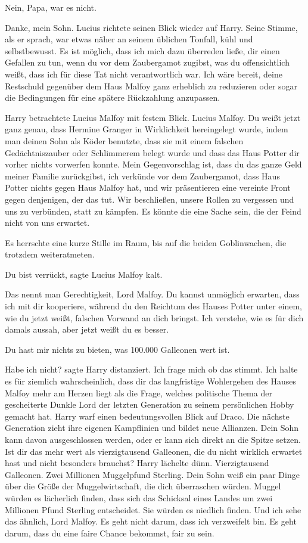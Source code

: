 \glqq{}Nein, Papa, war es nicht.\grqq{}

\glqq{}Danke, mein Sohn.\grqq{} Lucius richtete seinen Blick wieder auf Harry.
Seine Stimme, als er sprach, war etwas näher an seinem üblichen Tonfall, kühl
und selbstbewusst. \glqq{}Es ist möglich, dass ich mich dazu überreden ließe, dir
einen Gefallen zu tun, wenn du vor dem Zaubergamot zugibst, was du
offensichtlich weißt, dass ich für diese Tat nicht verantwortlich war. Ich wäre
bereit, deine Restschuld gegenüber dem Haus Malfoy ganz erheblich zu reduzieren
oder sogar die Bedingungen für eine spätere Rückzahlung anzupassen.\grqq{}

Harry betrachtete Lucius Malfoy mit festem Blick. \glqq{}Lucius Malfoy. Du weißt
jetzt ganz genau, dass Hermine Granger in Wirklichkeit hereingelegt wurde, indem
man deinen Sohn als Köder benutzte, dass sie mit einem falschen Gedächtniszauber
oder Schlimmerem belegt wurde und dass das Haus Potter dir vorher nichts
vorwerfen konnte. Mein Gegenvorschlag ist, dass du das ganze Geld meiner Familie
zurückgibst, ich verkünde vor dem Zaubergamot, dass Haus Potter nichts gegen
Haus Malfoy hat, und wir präsentieren eine vereinte Front gegen denjenigen, der
das tut. Wir beschließen, unsere Rollen zu vergessen und uns zu verbünden, statt
zu kämpfen. Es könnte die eine Sache sein, die der Feind nicht von uns
erwartet.\grqq{}

Es herrschte eine kurze Stille im Raum, bis auf die beiden Goblinwachen, die
trotzdem weiteratmeten.

\glqq{}Du bist verrückt\grqq{}, sagte Lucius Malfoy kalt.

\glqq{}Das nennt man Gerechtigkeit, Lord Malfoy. Du kannst unmöglich erwarten,
dass ich mit dir kooperiere, während du den Reichtum des Hauses Potter unter
einem, wie du jetzt weißt, falschen Vorwand an dich bringst. Ich verstehe, wie
es für dich damals aussah, aber jetzt weißt du es besser.\grqq{}

\glqq{}Du hast mir nichts zu bieten, was 100.000 Galleonen wert ist.\grqq{}

\glqq{}Habe ich nicht?\grqq{} sagte Harry distanziert. \glqq{}Ich frage mich ob
das stimmt. Ich halte es für ziemlich wahrscheinlich, dass dir das langfristige
Wohlergehen des Hauses Malfoy mehr am Herzen liegt als die Frage, welches
politische Thema der gescheiterte Dunkle Lord der letzten Generation zu seinem
persönlichen Hobby gemacht hat.\grqq{} Harry warf einen bedeutungsvollen Blick
auf Draco. \glqq{}Die nächste Generation zieht ihre eigenen Kampflinien und
bildet neue Allianzen. Dein Sohn kann davon ausgeschlossen werden, oder er kann
sich direkt an die Spitze setzen. Ist dir das mehr wert als vierzigtausend
Galleonen, die du nicht wirklich erwartet hast und nicht besonders
brauchst?\grqq{} Harry lächelte dünn. \glqq{}Vierzigtausend Galleonen. Zwei
Millionen Muggelpfund Sterling. Dein Sohn weiß ein paar Dinge über die Größe der
Muggelwirtschaft, die dich überraschen würden. Muggel würden es lächerlich
finden, dass sich das Schicksal eines Landes um zwei Millionen Pfund Sterling
entscheidet. Sie würden es niedlich finden. Und ich sehe das ähnlich, Lord
Malfoy. Es geht nicht darum, dass ich verzweifelt bin. Es geht darum, dass du
eine faire Chance bekommst, fair zu sein.\grqq{}

